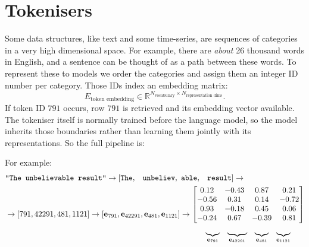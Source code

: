 \section{Tokenisers}
Some data structures, like text and some time-series, are sequences of categories in a very high dimensional space.
For example, there are \textit{about} 26 thousand words in English, and a sentence can be thought of as a path between these words. 
To represent these to models we order the categories and assign them an integer ID number per category.
Those IDs index an embedding matrix:
\[
    E_{\text{token embedding}}
    \in
    \mathbb{R}^{N_{\text{vocabulary}}\times N_{\text{representation dims}}}.
\]
If token ID $791$ occurs, row $791$ is retrieved and its embedding vector available.
The tokeniser itself is normally trained before the language model, so the model inherits those boundaries rather than learning them jointly with its representations.
So the full pipeline is:
\begin{figure}[htbp]
    \centering
    \label{fig:modern-tokenisation-flow}
\end{figure}
For example:
\begin{align}
    &\texttt{``The unbelievable result''}
    \rightarrow
    [\texttt{The},\ \texttt{ unbeliev},\ \texttt{able},\ \texttt{ result}]
    \rightarrow
    \\
    &\rightarrow
    [791,42291,481,1121]
    \rightarrow
    [\mathbf{e}_{791},\mathbf{e}_{42291},\mathbf{e}_{481},\mathbf{e}_{1121}]
    \rightarrow
    \begin{gathered}
    \begin{bmatrix}
        0.12 & -0.43 & 0.87 & 0.21\\
        -0.56 & 0.31 & 0.14 & -0.72\\
        0.93 & -0.18 & 0.45 & 0.06\\
        -0.24 & 0.67 & -0.39 & 0.81
    \end{bmatrix}\\[-1pt]
    \begin{array}{cccc}
        \underbrace{\hphantom{0.12}}_{\mathbf{e}_{791}} &
        \underbrace{\hphantom{-0.43}}_{\mathbf{e}_{42291}} &
        \underbrace{\hphantom{0.87}}_{\mathbf{e}_{481}} &
        \underbrace{\hphantom{0.21}}_{\mathbf{e}_{1121}}
    \end{array}
    \end{gathered}
\end{align}

